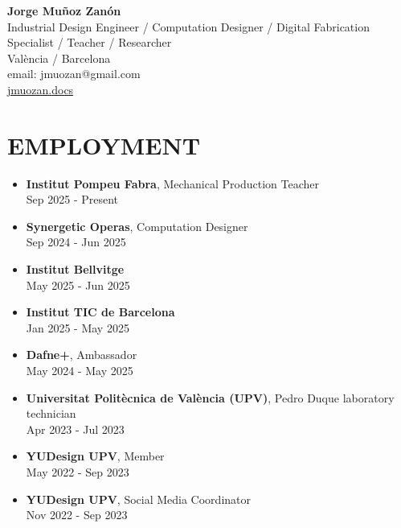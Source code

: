 \documentclass[11pt,a4paper]{article}
\begin{document}
\begin{center}
\textbf{\Large Jorge Muñoz Zanón}\\
\vspace{0.1cm}
Industrial Design Engineer / Computation Designer / Digital Fabrication Specialist / Teacher / Researcher\\
València / Barcelona\\
email: jmuozan@gmail.com\\
\href{https://jmuozan.github.io/docs/}{jmuozan.docs}
\end{center}


\section*{EMPLOYMENT}
\begin{itemize}[leftmargin=*,label={},itemsep=6pt]
    \item \textbf{Institut Pompeu Fabra}, Mechanical Production Teacher\\
    Sep 2025 - Present


    \item \textbf{Synergetic Operas}, Computation Designer\\
    Sep 2024 - Jun 2025

    \item \textbf{Institut Bellvitge}\\
    May 2025 - Jun 2025 
    
    \item \textbf{Institut TIC de Barcelona}\\
    Jan 2025 - May 2025 
    
    \item \textbf{Dafne+}, Ambassador\\
    May 2024 - May 2025 
    
    \item \textbf{Universitat Politècnica de València (UPV)}, Pedro Duque laboratory technician\\
    Apr 2023 - Jul 2023 
    
    \item \textbf{YUDesign UPV}, Member\\
    May 2022 - Sep 2023 
    
    \item \textbf{YUDesign UPV}, Social Media Coordinator\\
    Nov 2022 - Sep 2023 
\end{itemize}
\end{document}
